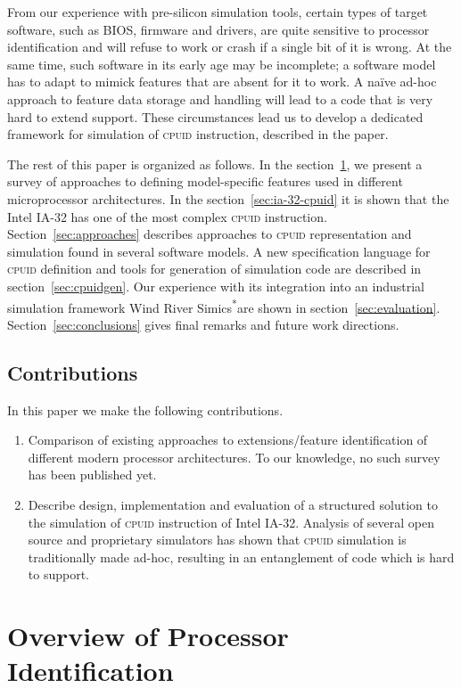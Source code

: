 \documentclass[a4paper,10pt,oneside,unicode]{article}
\newcommand{\cpuid}{\textsc{cpuid} }
\newcommand{\othercopyright}{\textsuperscript{*}}
\begin{document}
From our experience with pre-silicon simulation tools, certain types of target software, such as BIOS, firmware and drivers, are quite sensitive to processor identification and will refuse to work or crash if a single bit of it is wrong. At the same time, such software in its early age may be incomplete; a software model has to adapt to mimick features that are absent for it to work. A naïve ad-hoc approach to feature data storage and handling will lead to a code that is very hard to extend support. These circumstances lead us to develop a dedicated framework for simulation of \cpuid instruction, described in the paper.

The rest of this paper is organized as follows. In the section~\ref{sec:overview}, we present a survey of approaches to defining model-specific features used in different microprocessor architectures. In the section~\ref{sec:ia-32-cpuid} it is shown that the Intel IA-32 has one of the most complex \cpuid instruction. Section~\ref{sec:approaches} describes approaches to \cpuid representation and simulation found in several software models. A new specification language for \cpuid definition and tools for generation of simulation code are described in section~\ref{sec:cpuidgen}. Our experience with its integration  into an industrial simulation framework Wind River Simics\othercopyright are shown in section~\ref{sec:evaluation}. Section~\ref{sec:conclusions} gives final remarks and future work directions.

\subsection{Contributions}

In this paper we make the following contributions.
\begin{enumerate}
\item Comparison of existing approaches to extensions/feature identification of different modern processor architectures. To our knowledge, no such survey has been published yet.
\item Describe design, implementation and evaluation of a structured solution to the simulation of \cpuid instruction of Intel IA-32. Analysis of several open source and proprietary simulators has shown that \cpuid simulation is traditionally made ad-hoc, resulting in an entanglement of code which is hard to support.
\end{enumerate}

\section{Overview of Processor Identification}\label{sec:overview}
\end{document}
